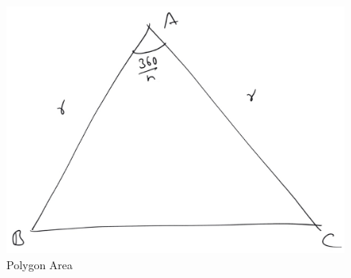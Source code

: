 \begin{figure}[!h]
	\begin{center}
		
		\includegraphics[width=\columnwidth]{./figs/ch5_polygon_area}
		\vspace*{-10cm}
	\end{center}
	\caption{Polygon Area}
	\label{ch5_polygon_area}	
\end{figure}
%

